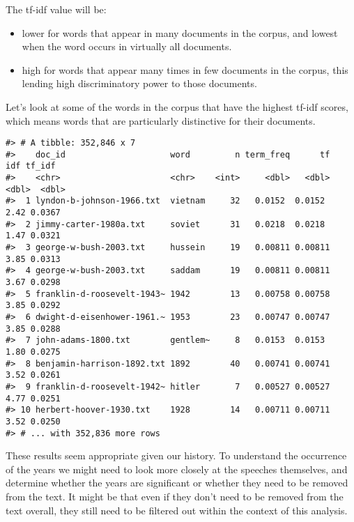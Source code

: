 \documentclass[]{book}
\newenvironment{Shaded}{\begin{snugshade}}{\end{snugshade}}
\newcommand{\KeywordTok}[1]{\textcolor[rgb]{0.13,0.29,0.53}{\textbf{#1}}}
\newcommand{\NormalTok}[1]{#1}
\newcommand{\OperatorTok}[1]{\textcolor[rgb]{0.81,0.36,0.00}{\textbf{#1}}}
\newcommand{\StringTok}[1]{\textcolor[rgb]{0.31,0.60,0.02}{#1}}
\providecommand{\tightlist}{%
  \setlength{\itemsep}{0pt}\setlength{\parskip}{0pt}}
\begin{document}
The tf-idf value will be:

\begin{itemize}
\tightlist
\item
  lower for words that appear in many documents in the corpus, and lowest when the word occurs in virtually all documents.
\item
  high for words that appear many times in few documents in the corpus, this lending high discriminatory power to those documents.
\end{itemize}

Let's look at some of the words in the corpus that have the highest tf-idf scores, which means words that are particularly distinctive for their documents.

\begin{Shaded}
\end{Shaded}

\begin{verbatim}
#> # A tibble: 352,846 x 7
#>    doc_id                     word         n term_freq      tf   idf tf_idf
#>    <chr>                      <chr>    <int>     <dbl>   <dbl> <dbl>  <dbl>
#>  1 lyndon-b-johnson-1966.txt  vietnam     32   0.0152  0.0152   2.42 0.0367
#>  2 jimmy-carter-1980a.txt     soviet      31   0.0218  0.0218   1.47 0.0321
#>  3 george-w-bush-2003.txt     hussein     19   0.00811 0.00811  3.85 0.0313
#>  4 george-w-bush-2003.txt     saddam      19   0.00811 0.00811  3.67 0.0298
#>  5 franklin-d-roosevelt-1943~ 1942        13   0.00758 0.00758  3.85 0.0292
#>  6 dwight-d-eisenhower-1961.~ 1953        23   0.00747 0.00747  3.85 0.0288
#>  7 john-adams-1800.txt        gentlem~     8   0.0153  0.0153   1.80 0.0275
#>  8 benjamin-harrison-1892.txt 1892        40   0.00741 0.00741  3.52 0.0261
#>  9 franklin-d-roosevelt-1942~ hitler       7   0.00527 0.00527  4.77 0.0251
#> 10 herbert-hoover-1930.txt    1928        14   0.00711 0.00711  3.52 0.0250
#> # ... with 352,836 more rows
\end{verbatim}

These results seem appropriate given our history. To understand the occurrence of the years we might need to look more closely at the speeches themselves, and determine whether the years are significant or whether they need to be removed from the text. It might be that even if they don't need to be removed from the text overall, they still need to be filtered out within the context of this analysis.
\end{document}
